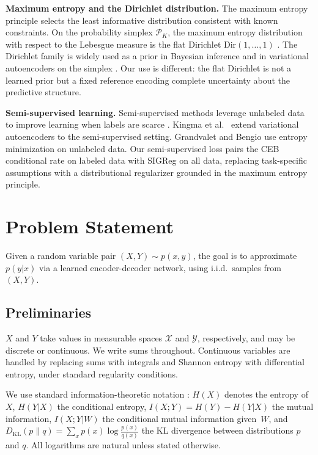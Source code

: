 \documentclass[11pt]{article}
\begin{document}
\medskip
\noindent\textbf{Maximum entropy and the Dirichlet distribution.}
The maximum entropy principle \cite{jaynes1957information} selects the
least informative distribution consistent with known constraints.
On the probability simplex $\mathcal{P}_K$, the maximum entropy
distribution with respect to the Lebesgue measure is the flat Dirichlet
$\mathrm{Dir}(1,\ldots,1)$ \cite{cover2006elements}.
The Dirichlet family is widely used as a prior in Bayesian inference
\cite{ferguson1973bayesian} and in variational autoencoders on the
simplex \cite{joo2020dirichlet}. Our use is different: the flat
Dirichlet is not a learned prior but a fixed reference encoding
complete uncertainty about the predictive structure.

\medskip
\noindent\textbf{Semi-supervised learning.}
Semi-supervised methods leverage unlabeled data to improve learning
when labels are scarce
\cite{grandvalet2004semi,kingma2014semi,vanengelen2020survey}.
Kingma et al.\ \cite{kingma2014semi} extend variational autoencoders
to the semi-supervised setting. Grandvalet and Bengio
\cite{grandvalet2004semi} use entropy minimization on unlabeled data.
Our semi-supervised loss pairs the CEB conditional rate on labeled
data with SIGReg on all data, replacing task-specific assumptions
with a distributional regularizer grounded in the maximum entropy
principle.


\section{Problem Statement}

Given a random variable pair $(X,Y)\sim p(x,y)$, the goal is to
approximate $p(y|x)$ via a learned encoder-decoder network, using
i.i.d.\ samples from $(X,Y)$.

\subsection{Preliminaries}
\label{sec:prelim}

$X$ and $Y$ take values in measurable spaces $\mathcal{X}$ and
$\mathcal{Y}$, respectively, and may be discrete or continuous.
We write sums throughout. Continuous variables are handled by replacing
sums with integrals and Shannon entropy with differential entropy,
under standard regularity conditions.

We use standard information-theoretic notation
\cite{cover2006elements}: $H(X)$ denotes the entropy of $X$,
$H(Y|X)$ the conditional entropy,
$I(X;Y)=H(Y)-H(Y|X)$ the mutual information,
$I(X;Y|W)$ the conditional mutual information given~$W$, and
$D_{\mathrm{KL}}(p\|q)=\sum_x p(x)\log\frac{p(x)}{q(x)}$ the
KL divergence between distributions $p$ and $q$.
All logarithms are natural unless stated otherwise.
\end{document}
